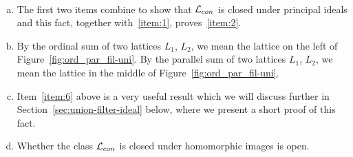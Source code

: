 \begin{remarks}\
  \begin{enumerate}[a.]
  \item 
  The first two items combine to show that $\mathcal{L}_{con}$ is closed under
  principal ideals and this fact, together with~\eqref{item:1}, 
  proves~\eqref{item:2}.
  
  

  \item By the ordinal sum of two lattices $L_1$, $L_2$, we mean the lattice
  on the left of Figure~\ref{fig:ord_par_fil-uni}.
  By the parallel sum of two lattices $L_1$, $L_2$, we mean the lattice
  in the middle of Figure~\ref{fig:ord_par_fil-uni}.

\item Item~\eqref{item:6} above is a very useful result which we will discuss further in
  Section~\ref{sec:union-filter-ideal} below, where we present a short proof of
  this fact.

\item Whether the class $\mathcal{L}_{con}$ is closed under homomorphic images is open. 
  \end{enumerate}
\end{remarks}

